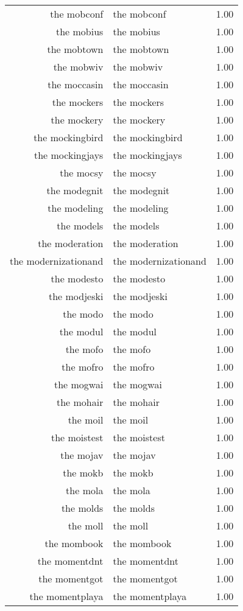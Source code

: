 \begin{table}[ht]
\begin{tabular}{rlr}
  the mobconf & the mobconf & 1.00 \\ 
  the mobius & the mobius & 1.00 \\ 
  the mobtown & the mobtown & 1.00 \\ 
  the mobwiv & the mobwiv & 1.00 \\ 
  the moccasin & the moccasin & 1.00 \\ 
  the mockers & the mockers & 1.00 \\ 
  the mockery & the mockery & 1.00 \\ 
  the mockingbird & the mockingbird & 1.00 \\ 
  the mockingjays & the mockingjays & 1.00 \\ 
  the mocsy & the mocsy & 1.00 \\ 
  the modegnit & the modegnit & 1.00 \\ 
  the modeling & the modeling & 1.00 \\ 
  the models & the models & 1.00 \\ 
  the moderation & the moderation & 1.00 \\ 
  the modernizationand & the modernizationand & 1.00 \\ 
  the modesto & the modesto & 1.00 \\ 
  the modjeski & the modjeski & 1.00 \\ 
  the modo & the modo & 1.00 \\ 
  the modul & the modul & 1.00 \\ 
  the mofo & the mofo & 1.00 \\ 
  the mofro & the mofro & 1.00 \\ 
  the mogwai & the mogwai & 1.00 \\ 
  the mohair & the mohair & 1.00 \\ 
  the moil & the moil & 1.00 \\ 
  the moistest & the moistest & 1.00 \\ 
  the mojav & the mojav & 1.00 \\ 
  the mokb & the mokb & 1.00 \\ 
  the mola & the mola & 1.00 \\ 
  the molds & the molds & 1.00 \\ 
  the moll & the moll & 1.00 \\ 
  the mombook & the mombook & 1.00 \\ 
  the momentdnt & the momentdnt & 1.00 \\ 
  the momentgot & the momentgot & 1.00 \\ 
  the momentplaya & the momentplaya & 1.00 \\ 

\end{tabular}
\end{table}

